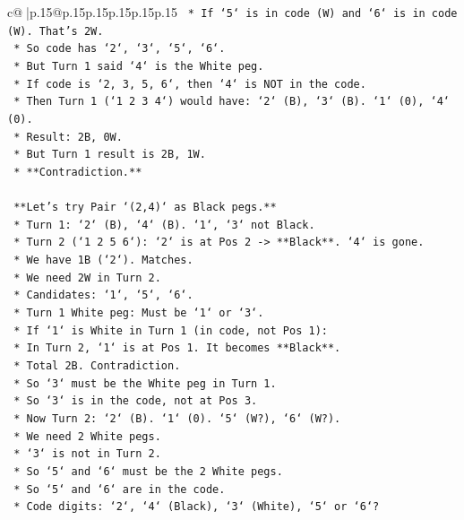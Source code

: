 \documentclass{article}
\begin{document}
{\begin{supertabular}{c@{$\;$}|p{.15\linewidth}@{}p{.15\linewidth}p{.15\linewidth}p{.15\linewidth}p{.15\linewidth}p{.15\linewidth}}
{{{\texttt{    *   If `5` is in code (W) and `6` is in code (W). That's 2W.} \\
\texttt{    *   So code has `2`, `3`, `5`, `6`.} \\
\texttt{    *   But Turn 1 said `4` is the White peg.} \\
\texttt{    *   If code is `2, 3, 5, 6`, then `4` is NOT in the code.} \\
\texttt{    *   Then Turn 1 (`1 2 3 4`) would have: `2` (B), `3` (B). `1` (0), `4` (0).} \\
\texttt{    *   Result: 2B, 0W.} \\
\texttt{    *   But Turn 1 result is 2B, 1W.} \\
\texttt{    *   **Contradiction.**} \\
\\ 
\texttt{    **Let's try Pair `(2,4)` as Black pegs.**} \\
\texttt{    *   Turn 1: `2` (B), `4` (B). `1`, `3` not Black.} \\
\texttt{    *   Turn 2 (`1 2 5 6`): `2` is at Pos 2 {-}> **Black**. `4` is gone.} \\
\texttt{    *   We have 1B (`2`). Matches.} \\
\texttt{    *   We need 2W in Turn 2.} \\
\texttt{    *   Candidates: `1`, `5`, `6`.} \\
\texttt{    *   Turn 1 White peg: Must be `1` or `3`.} \\
\texttt{    *   If `1` is White in Turn 1 (in code, not Pos 1):} \\
\texttt{        *   In Turn 2, `1` is at Pos 1. It becomes **Black**.} \\
\texttt{        *   Total 2B. Contradiction.} \\
\texttt{    *   So `3` must be the White peg in Turn 1.} \\
\texttt{    *   So `3` is in the code, not at Pos 3.} \\
\texttt{    *   Now Turn 2: `2` (B). `1` (0). `5` (W?), `6` (W?).} \\
\texttt{    *   We need 2 White pegs.} \\
\texttt{    *   `3` is not in Turn 2.} \\
\texttt{    *   So `5` and `6` must be the 2 White pegs.} \\
\texttt{    *   So `5` and `6` are in the code.} \\
\texttt{    *   Code digits: `2`, `4` (Black), `3` (White), `5` or `6`?} \\
}}}
\end{supertabular}}
\end{document}
